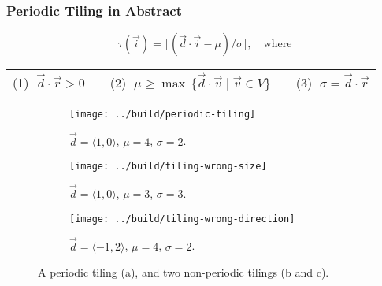 \documentclass{beamer}
\newcommand{\tuple}[1]{\langle #1 \rangle}
\begin{document}
\begin{frame}
\frametitle{Periodic Tiling in Abstract}

\[\tau(\vec{i}) = \lfloor(\vec{d} \cdot \vec{i} - \mu)/\sigma\rfloor, \quad \text{where}\]

\begin{center}
\begin{tabular}{c c c}
(1) $\; \vec{d} \cdot \vec{r} > 0 \quad$ &
(2) $\; \mu \geq \max \,\{ \vec{d} \cdot \vec{v} \;|\; \vec{v} \in V \} \quad$ &
(3) $\; \sigma = \vec{d} \cdot \vec{r}$
\end{tabular}
\end{center}

\begin{figure}
  \begin{subfigure}[t]{.32\linewidth}
    \texttt{[image: ../build/periodic-tiling]}
    \caption{$\vec{d} = \tuple{1,0}$, $\mu = 4$, $\sigma = 2$.
    }
    \label{fig:periodic-tiling:a}
  \end{subfigure}
  \begin{subfigure}[t]{.32\linewidth}
    \texttt{[image: ../build/tiling-wrong-size]}
    \caption{$\vec{d} = \tuple{1,0}$, $\mu = 3$, $\sigma = 3$.
    }
    \label{fig:periodic-tiling:b}
  \end{subfigure}
  \begin{subfigure}[t]{.32\linewidth}
    \texttt{[image: ../build/tiling-wrong-direction]}
    \caption{$\vec{d} = \tuple{-1,2}$, $\mu = 4$, $\sigma = 2$.
    }
    \label{fig:periodic-tiling:c}
  \end{subfigure}
  \caption{A periodic tiling (a), and two non-periodic tilings (b and c).}
  \label{fig:periodic-tiling}
\end{figure}

\end{frame}
\end{document}
